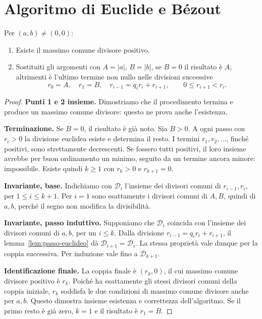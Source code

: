 \section{Algoritmo di Euclide e Bézout}
\begin{teorema}\label{teo:euclide}
Per $(a,b)\ne(0,0)$:
\begin{enumerate}[label=\arabic*.]
\item Esiste il massimo comune divisore positivo.
\item Sostituiti gli argomenti con $A=|a|$, $B=|b|$, se $B=0$ il risultato è $A$; altrimenti è l'ultimo termine non nullo nelle divisioni successive
\[
r_0=A,\quad r_1=B,\quad
r_{i-1}=q_i r_i+r_{i+1},\qquad 0\le r_{i+1}<r_i.
\]
\end{enumerate}
\end{teorema}
\begin{proof}
\textbf{Punti 1 e 2 insieme.} Dimostriamo che il procedimento termina e produce un massimo comune divisore: questo ne prova anche l'esistenza.

\textbf{Terminazione.} Se $B=0$, il risultato è già noto. Sia $B>0$. A ogni passo con $r_i>0$ la divisione euclidea esiste e determina il resto. I termini $r_1,r_2,\ldots$, finché positivi, sono strettamente decrescenti. Se fossero tutti positivi, il loro insieme avrebbe per buon ordinamento un minimo, seguito da un termine ancora minore: impossibile. Esiste quindi $k\ge1$ con $r_k>0$ e $r_{k+1}=0$.

\textbf{Invariante, base.} Indichiamo con $\mathcal D_i$ l'insieme dei divisori comuni di $r_{i-1},r_i$, per $1\le i\le k+1$. Per $i=1$ sono esattamente i divisori comuni di $A,B$, quindi di $a,b$, perché il segno non modifica la divisibilità.

\textbf{Invariante, passo induttivo.} Supponiamo che $\mathcal D_i$ coincida con l'insieme dei divisori comuni di $a,b$, per un $i\le k$. Dalla divisione $r_{i-1}=q_i r_i+r_{i+1}$, il lemma~\ref{lem:passo-euclideo} dà $\mathcal D_{i+1}=\mathcal D_i$. La stessa proprietà vale dunque per la coppia successiva. Per induzione vale fino a $\mathcal D_{k+1}$.

\textbf{Identificazione finale.} La coppia finale è $(r_k,0)$, il cui massimo comune divisore positivo è $r_k$. Poiché ha esattamente gli stessi divisori comuni della coppia iniziale, $r_k$ soddisfa le due condizioni di massimo comune divisore anche per $a,b$. Questo dimostra insieme esistenza e correttezza dell'algoritmo. Se il primo resto è già zero, $k=1$ e il risultato è $r_1=B$.
\end{proof}

